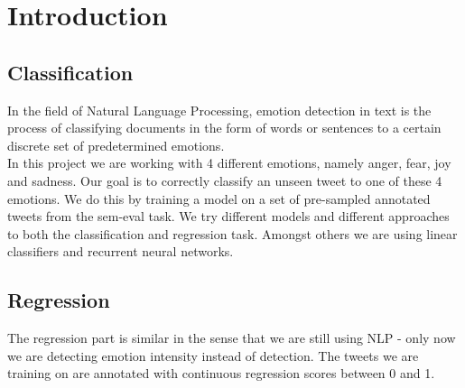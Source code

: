 \section{Introduction}
\subsection{Classification}
In the field of Natural Language Processing, emotion detection in text is the process of classifying documents in the form of words or sentences to a certain discrete set of predetermined emotions. \\
In this project we are working with 4 different emotions, namely anger, fear, joy and sadness. Our goal is to correctly classify an unseen tweet to one of these 4 emotions. We do this by training a model on a set of pre-sampled annotated tweets from the sem-eval task. We try different models and different approaches to both the classification and regression task. Amongst others we are using linear classifiers and recurrent neural networks.
\subsection{Regression}
The regression part is similar in the sense that we are still using NLP - only now we are detecting emotion intensity instead of detection. The tweets we are training on are annotated with continuous regression scores between 0 and 1.